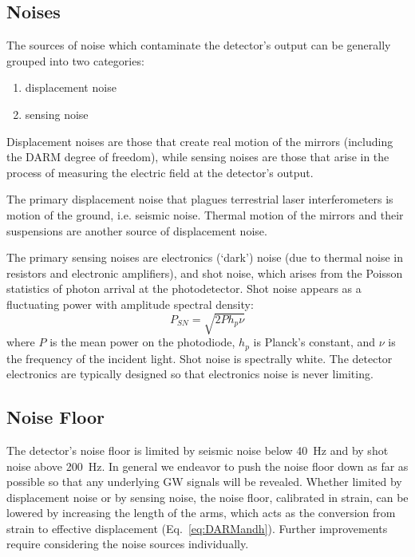 \subsection{Noises}
The sources of noise which contaminate the detector's output can be 
generally grouped into two categories:
\begin{enumerate}
\item displacement noise \vspace{-10 pt}
\item sensing noise
\end{enumerate}
Displacement noises are those that create real motion of the mirrors
(including the DARM degree of freedom), while sensing noises are those
that arise in the process of measuring the electric field at the 
detector's output.

The primary displacement noise that plagues terrestrial laser
interferometers is motion of the ground, i.e. seismic noise.  Thermal
motion of the mirrors and their suspensions are another source of
displacement noise. 



The primary sensing noises are electronics (`dark') noise (due to
thermal noise in resistors and electronic amplifiers), and shot
noise, which arises from the Poisson statistics of photon arrival
at the photodetector. Shot noise appears as a
fluctuating power with amplitude spectral density:
\begin{equation}
P_{SN} = \sqrt{2 P h_p \nu}
\label{eq:shotnoise}
\end{equation}
where $P$ is the mean power on the photodiode, $h_p$ is Planck's
constant, and $\nu$ is the frequency of the incident light. Shot noise
is spectrally white.  The detector electronics are typically designed
so that electronics noise is never limiting.

\subsection{Noise Floor}
The detector's noise floor is limited by seismic noise below 40~Hz and
by shot noise above 200~Hz.   In general we endeavor to push the noise floor down as far as possible
so that any underlying GW signals will be revealed.  Whether
limited by displacement noise or by sensing noise, the noise floor,
calibrated in strain, can be lowered by increasing the length of the
arms, which acts as the conversion from strain to effective displacement
(Eq.~\ref{eq:DARMandh}).
Further improvements require considering the noise
sources individually.

